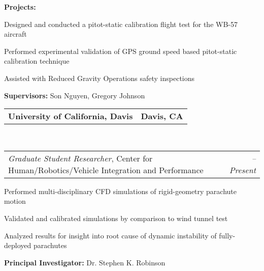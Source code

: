 \documentclass[10pt,letterpaper,MMMyyyy,nonstop]{simpleresumecv}
\makeatletter
\newcommand\hrvip{Center for Human/Robotics/Vehicle Integration and Performance}
\newcommand\UCDavis{University of California, Davis}
\newcommand{\headerrow}[2]
{\begin{tabular*}{\linewidth}{l@{\extracolsep{\fill}}r}
    #1 &
    #2 \\
\end{tabular*}}
\makeatother
\begin{document}
\begin{itemize}
\begin{itemize*}
            \item \textbf{Projects:}
            \begin{itemize*}
                \item Designed and conducted a pitot-static calibration flight test for the WB-57 aircraft
                \item Performed experimental validation of GPS ground speed based pitot-static calibration technique
                \item Assisted with Reduced Gravity Operations safety inspections
            \end{itemize*}

            \item \textbf{Supervisors:} Son Nguyen, Gregory Johnson
        \end{itemize*}

    \item
        \headerrow
        {\textbf{\UCDavis}}
        {\textbf{Davis, CA}}
        \\
        \headerrow
        {\emph{Graduate Student Researcher}, \hrvip}
        {\emph{\DatestampYMD{2013}{09}{020} -- Present}}
        \begin{itemize*}
            \item[]
            \begin{itemize*}
                \item Performed multi-disciplinary CFD simulations of rigid-geometry parachute motion
                \item Validated and calibrated simulations by comparison to wind tunnel test
                \item Analyzed results for insight into root cause of dynamic instability of fully-deployed parachutes
            \end{itemize*}
            \item \textbf{Principal Investigator:} Dr. Stephen K. Robinson
        \end{itemize*}


\end{itemize}
\end{document}

